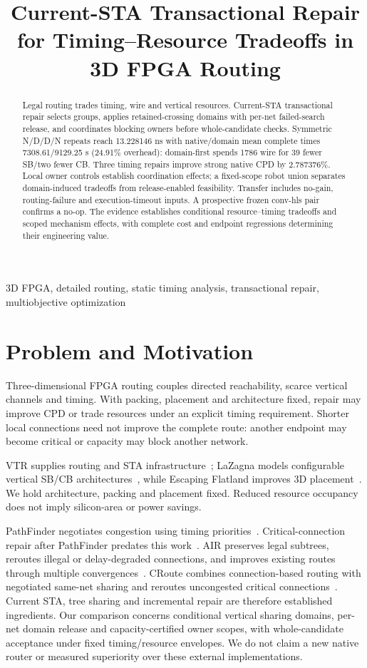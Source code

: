 \documentclass[conference,10pt]{IEEEtran}
\title{Current-STA Transactional Repair for Timing--Resource Tradeoffs in 3D FPGA Routing}
\author{\IEEEauthorblockN{Anonymous submission}}
\begin{document}
\maketitle
\begin{abstract}
Legal routing trades timing, wire and vertical resources. Current-STA transactional repair selects groups, applies retained-crossing domains with per-net failed-search release, and coordinates blocking owners before whole-candidate checks. Symmetric N/D/D/N repeats reach 13.228146 ns with native/domain mean complete times 7308.61/9129.25 s (24.91\% overhead): domain-first spends 1786 wire for 39 fewer SB/two fewer CB. Three timing repairs improve strong native CPD by 2.787376\%. Local owner controls establish coordination effects; a fixed-scope robot union separates domain-induced tradeoffs from release-enabled feasibility. Transfer includes no-gain, routing-failure and execution-timeout inputs. A prospective frozen conv-hls pair confirms a no-op. The evidence establishes conditional resource--timing tradeoffs and scoped mechanism effects, with complete cost and endpoint regressions determining their engineering value.
\end{abstract}
\begin{IEEEkeywords}
3D FPGA, detailed routing, static timing analysis, transactional repair, multiobjective optimization
\end{IEEEkeywords}

\section{Problem and Motivation}
Three-dimensional FPGA routing couples directed reachability, scarce vertical channels and timing. With packing, placement and architecture fixed, repair may improve CPD or trade resources under an explicit timing requirement. Shorter local connections need not improve the complete route: another endpoint may become critical or capacity may block another network.

VTR supplies routing and STA infrastructure~\cite{vtr9paper}; LaZagna models configurable vertical SB/CB architectures~\cite{lazagna}, while Escaping Flatland improves 3D placement~\cite{flatland}. We hold architecture, packing and placement fixed. Reduced resource occupancy does not imply silicon-area or power savings.

PathFinder negotiates congestion using timing priorities~\cite{pathfinder}. Critical-connection repair after PathFinder predates this work~\cite{liurepair}. AIR preserves legal subtrees, reroutes illegal or delay-degraded connections, and improves existing routes through multiple convergences~\cite{air}. CRoute combines connection-based routing with negotiated same-net sharing and reroutes uncongested critical connections~\cite{croute}. Current STA, tree sharing and incremental repair are therefore established ingredients. Our comparison concerns conditional vertical sharing domains, per-net domain release and capacity-certified owner scopes, with whole-candidate acceptance under fixed timing/resource envelopes. We do not claim a new native router or measured superiority over these external implementations.
\end{document}
